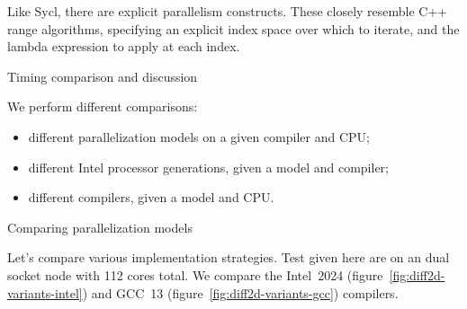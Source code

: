 
Like Sycl, there are explicit parallelism constructs.
These closely resemble C++ range algorithms,
specifying an explicit index space over which to iterate,
and the lambda expression to apply at each index.


 {Timing comparison and discussion}

We perform different comparisons:
\begin{itemize}
\item different parallelization models on a given compiler and CPU;
\item different Intel processor generations, given a model and compiler;
\item different compilers, given a model and CPU.
\end{itemize}

 {Comparing parallelization models}

Let's compare various implementation strategies.
Test given here are on an 
dual socket node with 112 cores total.
We compare the Intel~2024 (figure~\ref{fig:diff2d-variants-intel})
and GCC~13 (figure~\ref{fig:diff2d-variants-gcc})
compilers.

